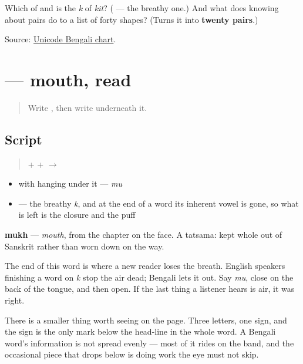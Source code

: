 \begin{tcolorbox}[breakable,colback=teal!4,colframe=teal!35!black,title={Before you move on}]
Which of \textbf{} and \textbf{} is the \emph{k} of \emph{kit}? (\textbf{} — the breathy one.) And what does knowing about pairs do to a list of forty shapes? (Turns it into \textbf{twenty pairs}.)

Source: \href{https://www.unicode.org/charts/PDF/U0980.pdf}{Unicode Bengali chart}.
\end{tcolorbox}
\section[mukh]{ — mouth, read}

\label{lesson:BN-W03-mukh-read}



\begin{quote}
Write \textbf{}, then write \textbf{} underneath it.
\end{quote}

\subsection*{Script}
\begin{quote}
\textbf{} + \textbf{} + \textbf{} $\to$ \textbf{}
\end{quote}

\begin{itemize}
\raggedright
  \item \textbf{} with \textbf{} hanging under it — \emph{mu}
  \item \textbf{} — the breathy \emph{k}, and at the end of a word its inherent vowel is gone, so what is left is the closure and the puff
\end{itemize}

\textbf{mukh} — \emph{mouth}, from the chapter on the face. A tatsama: kept whole out of Sanskrit rather than worn down on the way.

The end of this word is where a new reader loses the breath. English speakers finishing a word on \emph{k} stop the air dead; Bengali lets it out. Say \emph{mu}, close on the back of the tongue, and then open. If the last thing a listener hears is air, it was right.

There is a smaller thing worth seeing on the page. Three letters, one sign, and the sign is the only mark below the head-line in the whole word. A Bengali word's information is not spread evenly — most of it rides on the band, and the occasional piece that drops below is doing work the eye must not skip.


